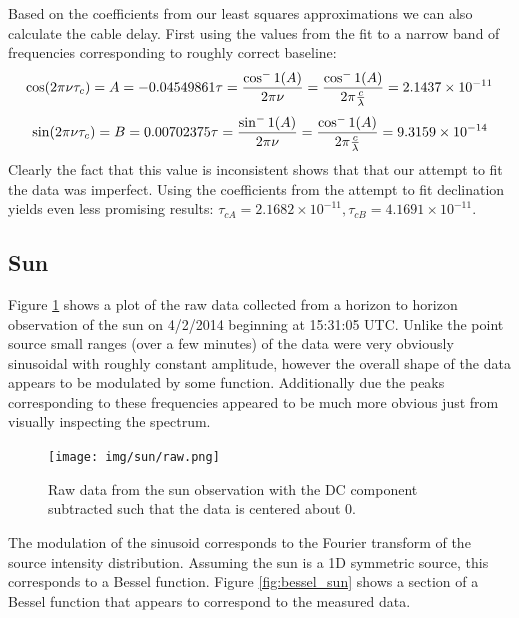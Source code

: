 \documentclass{article}
\begin{document}
    Based on the coefficients from our least squares approximations we can also
    calculate the cable delay. First using the values from the fit to a narrow
    band of frequencies corresponding to roughly correct baseline:
    \[\cos(2\pi\nu\tau_c) = A =  -0.04549861\\
      \tau =  \frac{\cos^-1(A)}{2\pi\nu}
      =\frac{\cos^-1(A)}{2\pi\frac{c}{\lambda}}
      = 2.1437 \times 10^{-11}
     \]
    \[\sin(2\pi\nu\tau_c) = B = 0.00702375\\
      \tau =  \frac{\sin^-1(A)}{2\pi\nu} \\
      =\frac{\cos^-1(A)}{2\pi\frac{c}{\lambda}} \\
      = 9.3159 \times 10^{-14}
     \]
    Clearly the fact that this value is inconsistent shows that that our
    attempt to fit the data was imperfect. Using the coefficients from the
    attempt to fit declination yields even less promising results: $\tau_{cA} =
    2.1682 \times 10^{-11}, \tau_{cB} = 4.1691 \times 10^{-11}$.


    \FloatBarrier
\subsection{Sun}
    Figure \ref{fig:raw_sun} shows a plot of the raw data collected from a
    horizon to horizon observation of the sun on 4/2/2014 beginning at
    15:31:05 UTC. Unlike the point source small ranges (over a few minutes) of the data were very
    obviously sinusoidal with roughly constant amplitude, however the overall
    shape of the data appears to be modulated by some function. Additionally due
    the peaks corresponding to these frequencies appeared to be much more
    obvious just from visually inspecting the spectrum.

    \begin{figure}[h!]
    \centering
    \texttt{[image: img/sun/raw.png]}
    \caption{Raw data from the sun observation with the DC component subtracted
    such that the data is centered about 0.}
    \label{fig:raw_sun}
    \end{figure}

    The modulation of the sinusoid corresponds to the Fourier transform of the
    source intensity distribution. Assuming the sun is a 1D symmetric source,
    this corresponds to a Bessel function. Figure \ref{fig:bessel_sun} shows a
    section of a Bessel function that appears to correspond to the measured
    data.
\end{document}
